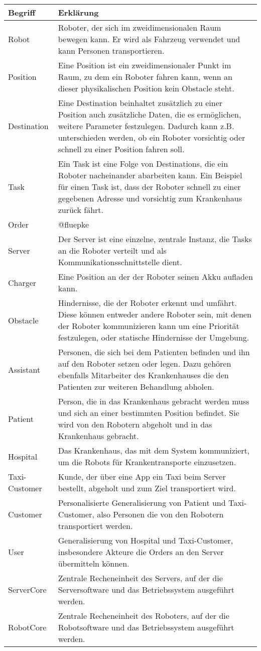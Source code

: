 	\begin{tabularx}{\textwidth}{|l|X|}
		\hline
		\textbf{Begriff} & \textbf{Erklärung}\\ \hline
		Robot & Roboter, der sich im zweidimensionalen Raum bewegen kann. Er wird als Fahrzeug verwendet und kann Personen transportieren.\\ \hline
		Position & Eine Position ist ein zweidimensionaler Punkt im Raum, zu dem ein Roboter fahren kann, wenn an dieser physikalischen Position kein Obstacle steht.\\ \hline
		Destination & Eine Destination beinhaltet zusätzlich zu einer Position auch zusätzliche Daten, die es ermöglichen, weitere Parameter festzulegen. 
		Dadurch kann z.B. unterschieden werden, ob ein Roboter vorsichtig oder schnell zu einer Position fahren soll. \\ \hline
		Task & Ein Task ist eine Folge von Destinations, die ein Roboter nacheinander abarbeiten kann. Ein Beispiel für einen Task ist, dass der Roboter schnell zu einer gegebenen Adresse und vorsichtig zum Krankenhaus zurück fährt.\\ \hline
		Order & @fluepke\\ \hline
		Server & Der Server ist eine einzelne, zentrale Instanz, die Tasks an die Roboter verteilt und als Kommunikationsschnittstelle dient.\\ \hline
		Charger & Eine Position an der der Roboter seinen Akku aufladen kann.\\ \hline
		Obstacle & Hindernisse, die der Roboter erkennt und umfährt. Diese können
		entweder andere Roboter sein, mit denen der Roboter kommunizieren kann
		um eine Priorität festzulegen, oder statische Hindernisse der
		Umgebung.\\ \hline
		Assistant & Personen, die sich bei dem Patienten befinden und ihn auf den Roboter setzen oder legen.
		 Dazu gehören ebenfalls Mitarbeiter des Krankenhauses die den Patienten zur weiteren Behandlung abholen.\\ \hline
		Patient & Person, die in das Krankenhaus gebracht werden muss und sich an einer bestimmten Position befindet. 
		Sie wird von den Robotern abgeholt und in das Krankenhaus gebracht.\\ \hline
		Hospital & Das Krankenhaus, das mit dem System kommuniziert, um die Robots für Krankentransporte einzusetzen. \\ \hline
		Taxi-Customer & Kunde, der über eine App ein Taxi beim Server bestellt, abgeholt und zum Ziel transportiert wird.\\ \hline
		Customer & Personalisierte Generalisierung von Patient und Taxi-Customer, also Personen die von den Robotern transportiert werden.\\ \hline
		User & Generalisierung von Hospital und Taxi-Customer, insbesondere Akteure die Orders an den Server übermitteln können.\\ \hline
		ServerCore & Zentrale Recheneinheit des Servers, auf der die Serversoftware und das Betriebssystem ausgeführt werden.\\ \hline
		RobotCore & Zentrale Recheneinheit des Roboters, auf der die Robotsoftware und das Betriebssystem ausgeführt werden.\\ \hline
	\end{tabularx}
